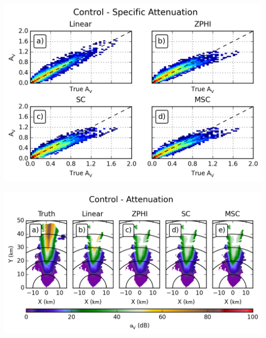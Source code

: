 \documentclass[red]{beamer}
\begin{document}
\begin{frame}
    \begin{center}
        \includegraphics[scale=0.7]{figures/C_Control_Specific_Attenuation_V_scatter}
    \end{center}
\end{frame}

\begin{frame}
    \begin{center}
        \includegraphics[scale=0.7]{figures/X_Control_Attenuation_V}
    \end{center}
\end{frame}
\end{document}
